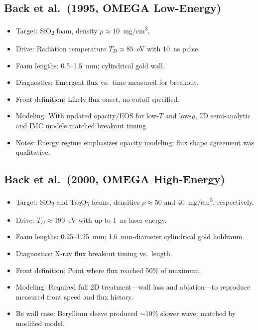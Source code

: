 \documentclass{article}
\begin{document}
\subsection*{Back et al.\ (1995, OMEGA Low-Energy)}

\begin{itemize}
    \item Target: SiO\textsubscript{2} foam, density $\rho \approx 10$~mg/cm\textsuperscript{3}.
    \item Drive: Radiation temperature $T_D \approx 85$~eV with 10~ns pulse.
    \item Foam lengths: 0.5--1.5~mm; cylindrical gold wall.
    \item Diagnostics: Emergent flux vs.\ time measured for breakout.
    \item Front definition: Likely flux onset, no cutoff specified.
    \item Modeling: With updated opacity/EOS for low-$T$ and low-$\rho$, 2D semi-analytic and IMC models matched breakout timing.
    \item Notes: Energy regime emphasizes opacity modeling; flux shape agreement was qualitative.
\end{itemize}

\subsection*{Back et al.\ (2000, OMEGA High-Energy)}

\begin{itemize}
    \item Target: SiO\textsubscript{2} and Ta\textsubscript{2}O\textsubscript{5} foams, densities $\rho \approx 50$ and 40~mg/cm\textsuperscript{3}, respectively.
    \item Drive: $T_D \approx 190$~eV with up to 1~ns laser energy.
    \item Foam lengths: 0.25--1.25~mm; 1.6~mm-diameter cylindrical gold hohlraum.
    \item Diagnostics: X-ray flux breakout timing vs.\ length.
    \item Front definition: Point where flux reached 50\% of maximum.
    \item Modeling: Required full 2D treatment—wall loss and ablation—to reproduce measured front speed and flux history.
    \item Be wall case: Beryllium sleeve produced $\sim$10\% slower wave; matched by modified model.
\end{itemize}
\end{document}
